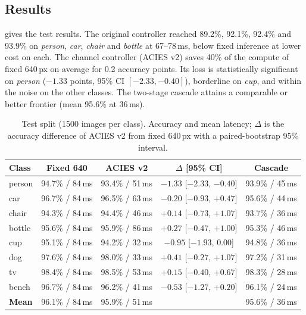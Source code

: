 \documentclass[11pt]{article}
\begin{document}
\subsection{Results}
 gives the test results. The original controller reached 89.2\%, 92.1\%, 92.4\%
and 93.9\% on \emph{person}, \emph{car}, \emph{chair} and \emph{bottle} at 67--78\,ms, below fixed
inference at lower cost on each. The channel controller (ACIES v2) saves 40\% of the compute of
fixed 640\,px on average for 0.2 accuracy points. Its loss is statistically significant on
\emph{person} ($-1.33$ points, 95\% CI $[-2.33,-0.40]$), borderline on \emph{cup}, and within the
noise on the other classes. The two-stage cascade attains a comparable or better frontier
(mean 95.6\% at 36\,ms).

\begin{table}[h]
\centering
\caption{Test split (1500 images per class). Accuracy and mean latency; $\Delta$ is the accuracy
difference of ACIES v2 from fixed 640\,px with a paired-bootstrap 95\% interval.}
\label{tab:main}
\begin{tabular}{lcccc}
\toprule
\textbf{Class} & \textbf{Fixed 640} & \textbf{ACIES v2} & $\Delta$ \textbf{[95\% CI]} & \textbf{Cascade} \\
\midrule
person & 94.7\% / 84\,ms & 93.4\% / 51\,ms & $-1.33$ [$-2.33$, $-0.40$] & 93.9\% / 45\,ms \\
car    & 96.7\% / 84\,ms & 96.5\% / 63\,ms & $-0.20$ [$-0.93$, $+0.47$] & 95.6\% / 44\,ms \\
chair  & 94.3\% / 84\,ms & 94.4\% / 46\,ms & $+0.14$ [$-0.73$, $+1.07$] & 93.7\% / 36\,ms \\
bottle & 95.6\% / 84\,ms & 95.9\% / 86\,ms & $+0.27$ [$-0.47$, $+1.00$] & 95.3\% / 46\,ms \\
cup    & 95.1\% / 84\,ms & 94.2\% / 32\,ms & $-0.95$ [$-1.93$, $0.00$]  & 94.8\% / 36\,ms \\
dog    & 97.6\% / 84\,ms & 98.0\% / 33\,ms & $+0.41$ [$-0.27$, $+1.07$] & 97.2\% / 31\,ms \\
tv     & 98.4\% / 84\,ms & 98.5\% / 53\,ms & $+0.15$ [$-0.40$, $+0.67$] & 98.3\% / 28\,ms \\
bench  & 96.7\% / 84\,ms & 96.2\% / 41\,ms & $-0.53$ [$-1.27$, $+0.20$] & 96.1\% / 24\,ms \\
\midrule
\textbf{Mean} & 96.1\% / 84\,ms & 95.9\% / 51\,ms & & 95.6\% / 36\,ms \\
\bottomrule
\end{tabular}
\end{table}
\end{document}
